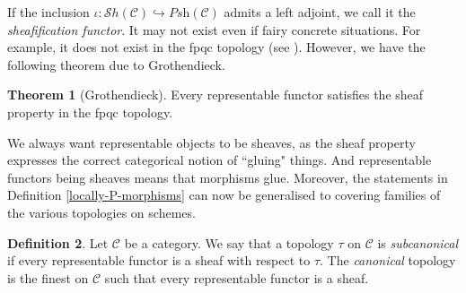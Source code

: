 \documentclass[11pt]{amsart}
\newcommand{\sS}{{\mathcal S}}
\newcommand{\Sh}{\sS h}
\theoremstyle{definition}
\newtheorem{theorem}{Theorem}[section]
\newtheorem{definition}[theorem]{Definition}
\begin{document}
If the inclusion $\iota: \Sh(\mathcal{C})\hookrightarrow \textit{Psh}(\mathcal{C})$ admits a left adjoint, we call it the \textit{sheafification functor}. It may not exist even if fairy concrete situations. For example, it does not exist in the fpqc topology (see \cite[Theorem 5.5]{Waterhouse-fpqc-sheafification}). However, we have the following theorem due to Grothendieck.

\begin{theorem}[Grothendieck]\label{fpqc-representable}
	Every representable functor satisfies the sheaf property in the fpqc topology.
\end{theorem}

We always want representable objects to be sheaves, as the sheaf property expresses the correct categorical notion of ``gluing" things. And representable functors being sheaves means that morphisms glue. Moreover, the statements in Definition \ref{locally-P-morphisms} can now be generalised to covering families of the various topologies on schemes.

\begin{definition}
	Let $\mathcal{C}$ be a category. We say that a topology $\tau$ on $\mathcal{C}$ is \textit{subcanonical} if every representable functor is a sheaf with respect to $\tau$. The \textit{canonical} topology is the finest on $\mathcal{C}$ such that every representable functor is a sheaf.
\end{definition}
\end{document}

